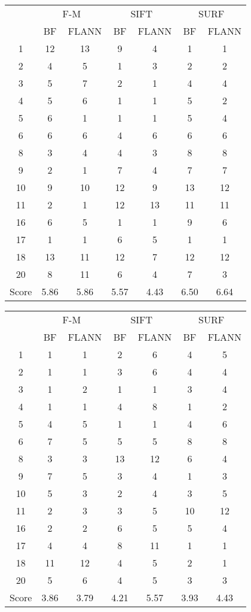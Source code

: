 \documentclass[draft,final]{vutinfth} %
\begin{document}
\begin{appendices}
\begin{minipage}{\linewidth}
\centering
\begin{tabular}{c|cc|cc|cc}
& \multicolumn{2}{c}{ F-M } & \multicolumn{2}{c}{ SIFT } & \multicolumn{2}{c}{ SURF } \\
& BF & FLANN & BF & FLANN & BF & FLANN \\
\hline
1 & 12 & 13 & 9 & 4 & 1 & 1 \\
2 & 4 & 5 & 1 & 3 & 2 & 2 \\
3 & 5 & 7 & 2 & 1 & 4 & 4 \\
4 & 5 & 6 & 1 & 1 & 5 & 2 \\
5 & 6 & 1 & 1 & 1 & 5 & 4 \\
6 & 6 & 6 & 4 & 6 & 6 & 6 \\
8 & 3 & 4 & 4 & 3 & 8 & 8 \\
9 & 2 & 1 & 7 & 4 & 7 & 7 \\
10 & 9 & 10 & 12 & 9 & 13 & 12 \\
11 & 2 & 1 & 12 & 13 & 11 & 11 \\
16 & 6 & 5 & 1 & 1 & 9 & 6 \\
17 & 1 & 1 & 6 & 5 & 1 & 1 \\
18 & 13 & 11 & 12 & 7 & 12 & 12 \\
20 & 8 & 11 & 6 & 4 & 7 & 3 \\
\hline
Score & 5.86 & 5.86 & 5.57 & 4.43 & 6.50 & 6.64 \\
\end{tabular}
 \label{tab:BL} 
\end{minipage}


\begin{minipage}{\linewidth}
\centering
\begin{tabular}{c|cc|cc|cc}
\multirow{2}{*}{ } & \multicolumn{2}{c}{ F-M } & \multicolumn{2}{c}{ SIFT } & \multicolumn{2}{c}{ SURF } \\
& BF & FLANN & BF & FLANN & BF & FLANN \\
\hline
1 & 1 & 1 & 2 & 6 & 4 & 5 \\
2 & 1 & 1 & 3 & 6 & 4 & 4 \\
3 & 1 & 2 & 1 & 1 & 3 & 4 \\
4 & 1 & 1 & 4 & 8 & 1 & 2 \\
5 & 4 & 5 & 1 & 1 & 4 & 6 \\
6 & 7 & 5 & 5 & 5 & 8 & 8 \\
8 & 3 & 3 & 13 & 12 & 6 & 4 \\
9 & 7 & 5 & 3 & 4 & 1 & 3 \\
10 & 5 & 3 & 2 & 4 & 3 & 5 \\
11 & 2 & 3 & 3 & 5 & 10 & 12 \\
16 & 2 & 2 & 6 & 5 & 5 & 4 \\
17 & 4 & 4 & 8 & 11 & 1 & 1 \\
18 & 11 & 12 & 4 & 5 & 2 & 1 \\
20 & 5 & 6 & 4 & 5 & 3 & 3 \\
\hline
Score & 3.86 & 3.79 & 4.21 & 5.57 & 3.93 & 4.43 \\
\end{tabular}


\end{minipage}
\end{appendices}
\end{document}
